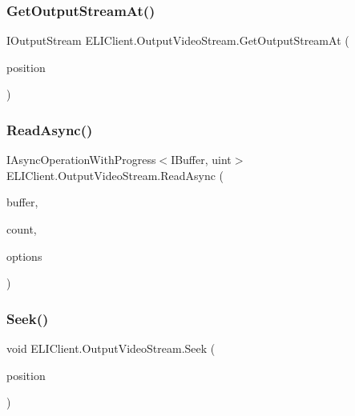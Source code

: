 \subsubsection{\texorpdfstring{Get\+Output\+Stream\+At()}{GetOutputStreamAt()}}
{\footnotesize\ttfamily I\+Output\+Stream E\+L\+I\+Client.\+Output\+Video\+Stream.\+Get\+Output\+Stream\+At (\begin{DoxyParamCaption}\item[{ulong}]{position }\end{DoxyParamCaption})\hspace{0.3cm}{\ttfamily [inline]}}

\mbox{\label{class_e_l_i_client_1_1_output_video_stream_aa42ec5fa6c418ad002df0b937a3b8144}} 
\subsubsection{\texorpdfstring{Read\+Async()}{ReadAsync()}}
{\footnotesize\ttfamily I\+Async\+Operation\+With\+Progress$<$I\+Buffer, uint$>$ E\+L\+I\+Client.\+Output\+Video\+Stream.\+Read\+Async (\begin{DoxyParamCaption}\item[{I\+Buffer}]{buffer,  }\item[{uint}]{count,  }\item[{Input\+Stream\+Options}]{options }\end{DoxyParamCaption})\hspace{0.3cm}{\ttfamily [inline]}}

\mbox{\label{class_e_l_i_client_1_1_output_video_stream_a0c808f0f0fa8388008e25cb54f174cc6}} 
\subsubsection{\texorpdfstring{Seek()}{Seek()}}
{\footnotesize\ttfamily void E\+L\+I\+Client.\+Output\+Video\+Stream.\+Seek (\begin{DoxyParamCaption}\item[{ulong}]{position }\end{DoxyParamCaption})\hspace{0.3cm}{\ttfamily [inline]}}

